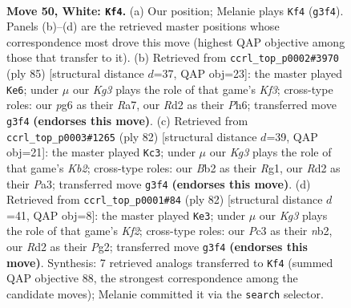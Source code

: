 \documentclass[11pt]{article}
\begin{document}
\clearpage

\begin{figure}[p]\centering
\begin{subfigure}{0.46\textwidth}\centering
\resizebox{\linewidth}{!}{%
\newchessgame
\chessboard[
  setfen={6k1/1p2p3/n5pp/pNr5/P1p5/2P2PK1/1B1R4/8 w - - 5 50},
  showmover=false,
  pgfstyle=straightmove, color=movearrow, markmove={g3-f4}
]}
\caption{}
\end{subfigure}\hfill
\begin{subfigure}{0.46\textwidth}\centering
\resizebox{\linewidth}{!}{%
\newchessgame
\chessboard[
  setfen={8/r7/3p1k1p/PRn3pP/4p3/4N1P1/5P2/5K2 b - - 6 43},
  showmover=false,
  pgfstyle=straightmove, color=movearrow, markmove={f6-e6}
]}
\caption{}
\end{subfigure}
\\[4pt]
\begin{subfigure}{0.46\textwidth}\centering
\resizebox{\linewidth}{!}{%
\newchessgame
\chessboard[
  setfen={2b2k2/1n2r3/p1B2p2/6p1/1PpN4/P7/1K3P2/6R1 w - - 4 42},
  showmover=false,
  pgfstyle=straightmove, color=movearrow, markmove={b2-c3}
]}
\caption{}
\end{subfigure}\hfill
\begin{subfigure}{0.46\textwidth}\centering
\resizebox{\linewidth}{!}{%
\newchessgame
\chessboard[
  setfen={3r4/p4k1p/1p6/1R2p1pP/4P3/PP6/1n3KP1/4B3 w - - 1 42},
  showmover=false,
  pgfstyle=straightmove, color=movearrow, markmove={f2-e3}
]}
\caption{}
\end{subfigure}
\caption{\textbf{Move 50, White: \texttt{Kf4}.} (a) Our position; Melanie plays \texttt{Kf4} (\texttt{g3f4}). Panels (b)--(d) are the retrieved master positions whose correspondence most drove this move (highest QAP objective among those that transfer to it). (b) Retrieved from \texttt{ccrl\_top\_p0002\#3970} (ply 85) [structural distance $d$=37, QAP obj=23]: the master played \texttt{Ke6}; under $\mu$ our \emph{Kg3} plays the role of that game's \emph{Kf3}; cross-type roles: our \emph{p}g6 as their \emph{R}a7, our \emph{R}d2 as their \emph{P}h6; transferred move \texttt{g3f4} \textbf{(endorses this move)}. (c) Retrieved from \texttt{ccrl\_top\_p0003\#1265} (ply 82) [structural distance $d$=39, QAP obj=21]: the master played \texttt{Kc3}; under $\mu$ our \emph{Kg3} plays the role of that game's \emph{Kb2}; cross-type roles: our \emph{B}b2 as their \emph{R}g1, our \emph{R}d2 as their \emph{P}a3; transferred move \texttt{g3f4} \textbf{(endorses this move)}. (d) Retrieved from \texttt{ccrl\_top\_p0001\#84} (ply 82) [structural distance $d$=41, QAP obj=8]: the master played \texttt{Ke3}; under $\mu$ our \emph{Kg3} plays the role of that game's \emph{Kf2}; cross-type roles: our \emph{P}c3 as their \emph{n}b2, our \emph{R}d2 as their \emph{P}g2; transferred move \texttt{g3f4} \textbf{(endorses this move)}. Synthesis: 7 retrieved analogs transferred to \texttt{Kf4} (summed QAP objective 88, the strongest correspondence among the candidate moves); Melanie committed it via the \texttt{search} selector.}
\label{fig:thought-m98}
\end{figure}
\end{document}
